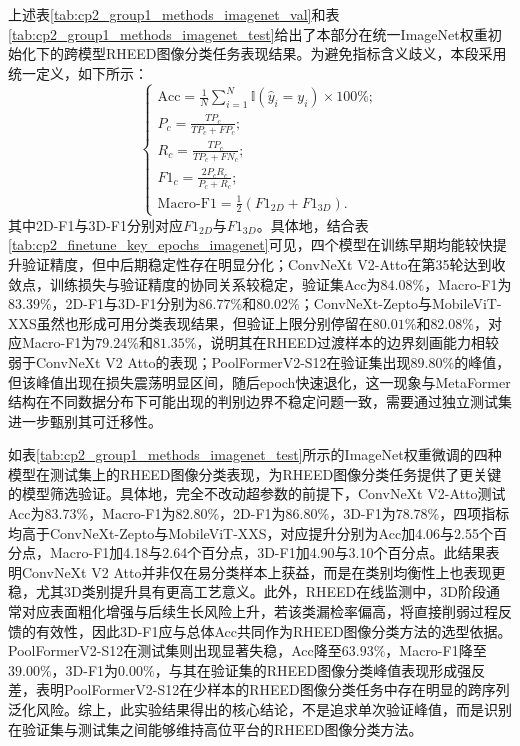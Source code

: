 上述表\ref{tab:cp2_group1_methods_imagenet_val}和表\ref{tab:cp2_group1_methods_imagenet_test}给出了本部分在统一ImageNet权重初始化下的跨模型RHEED图像分类任务表现结果。为避免指标含义歧义，本段采用统一定义，如下所示：
\begin{equation}
    \left\{
    \begin{array}{l}
        {\mathrm{Acc}=\frac{1}{N}\sum_{i=1}^{N}\mathbb{I}(\hat{y}_i=y_i)\times 100\%}; \\
        {P_c=\frac{TP_c}{TP_c+FP_c}}; \\
        {R_c=\frac{TP_c}{TP_c+FN_c}}; \\
        {F1_c=\frac{2P_cR_c}{P_c+R_c}}; \\
        {\mathrm{Macro\mbox{-}F1}=\frac{1}{2}(F1_{2D}+F1_{3D})}.
    \end{array}
    \right.
\end{equation}
其中2D-F1与3D-F1分别对应$F1_{2D}$与$F1_{3D}$。具体地，结合表\ref{tab:cp2_finetune_key_epochs_imagenet}可见，四个模型在训练早期均能较快提升验证精度，但中后期稳定性存在明显分化；ConvNeXt V2-Atto在第35轮达到收敛点，训练损失与验证精度的协同关系较稳定，验证集Acc为$84.08\%$，Macro-F1为$83.39\%$，2D-F1与3D-F1分别为$86.77\%$和$80.02\%$；ConvNeXt-Zepto与MobileViT-XXS虽然也形成可用分类表现结果，但验证上限分别停留在$80.01\%$和$82.08\%$，对应Macro-F1为$79.24\%$和$81.35\%$，说明其在RHEED过渡样本的边界刻画能力相较弱于ConvNeXt V2 Atto的表现；PoolFormerV2-S12在验证集出现$89.80\%$的峰值，但该峰值出现在损失震荡明显区间，随后epoch快速退化，这一现象与MetaFormer结构在不同数据分布下可能出现的判别边界不稳定问题一致，需要通过独立测试集进一步甄别其可迁移性。

如表\ref{tab:cp2_group1_methods_imagenet_test}所示的ImageNet权重微调的四种模型在测试集上的RHEED图像分类表现，为RHEED图像分类任务提供了更关键的模型筛选验证。具体地，完全不改动超参数的前提下，ConvNeXt V2-Atto测试Acc为$83.73\%$，Macro-F1为$82.80\%$，2D-F1为$86.80\%$，3D-F1为$78.78\%$，四项指标均高于ConvNeXt-Zepto与MobileViT-XXS，对应提升分别为Acc加4.06与2.55个百分点，Macro-F1加4.18与2.64个百分点，3D-F1加4.90与3.10个百分点。此结果表明ConvNeXt V2 Atto并非仅在易分类样本上获益，而是在类别均衡性上也表现更稳，尤其3D类别提升具有更高工艺意义。此外，RHEED在线监测中，3D阶段通常对应表面粗化增强与后续生长风险上升，若该类漏检率偏高，将直接削弱过程反馈的有效性，因此3D-F1应与总体Acc共同作为RHEED图像分类方法的选型依据。PoolFormerV2-S12在测试集则出现显著失稳，Acc降至$63.93\%$，Macro-F1降至$39.00\%$，3D-F1为$0.00\%$，与其在验证集的RHEED图像分类峰值表现形成强反差，表明PoolFormerV2-S12在少样本的RHEED图像分类任务中存在明显的跨序列泛化风险。综上，此实验结果得出的核心结论，不是追求单次验证峰值，而是识别在验证集与测试集之间能够维持高位平台的RHEED图像分类方法。


